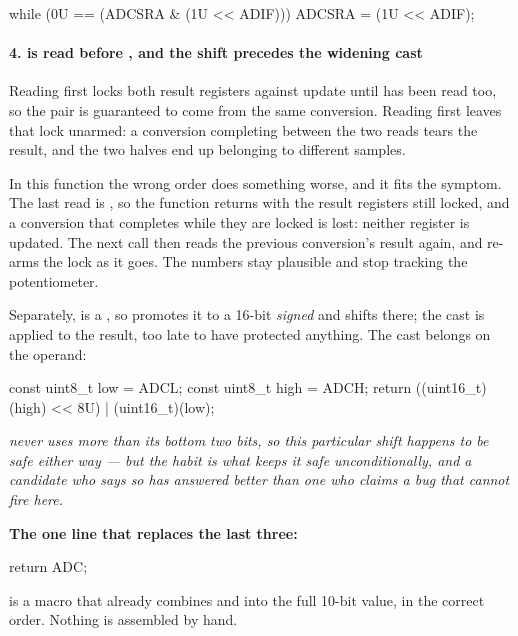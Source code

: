 \begin{ccode}
while (0U == (ADCSRA & (1U << ADIF))) {}
ADCSRA = (1U << ADIF);
\end{ccode}

\paragraph{4.  is read before , and the shift precedes the widening cast}
Reading  first locks both result registers against update until  has been
read too, so the pair is guaranteed to come from the same conversion. Reading  first
leaves that lock unarmed: a conversion completing between the two reads tears the result, and the
two halves end up belonging to different samples.

In this function the wrong order does something worse, and it fits the symptom. The last read is
, so the function returns with the result registers still locked, and a conversion that
completes while they are locked is lost: neither register is updated. The next call then reads the
previous conversion's result again, and re-arms the lock as it goes. The numbers stay plausible and
stop tracking the potentiometer.

Separately,  is a , so  promotes it to a 16-bit
\emph{signed}  and shifts there; the  cast is applied to the result, too
late to have protected anything. The cast belongs on the operand:

\begin{ccode}
const uint8_t low  = ADCL;
const uint8_t high = ADCH;
return ((uint16_t)(high) << 8U) | (uint16_t)(low);
\end{ccode}

\noindent\textit{ never uses more than its bottom two bits, so this particular shift
happens to be safe either way --- but the habit is what keeps it safe unconditionally, and a
candidate who says so has answered better than one who claims a bug that cannot fire here.}

\textbf{The one line that replaces the last three:}

\begin{ccode}
return ADC;
\end{ccode}

\noindent{} is a macro that already combines  and  into the full
10-bit value, in the correct order. Nothing is assembled by hand. 

